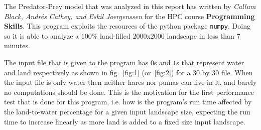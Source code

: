 \documentclass[12pt,a4paper]{article}
\begin{document}
The Predator-Prey model that was analyzed in this report has written by 
\textit{Callum Black, Andr\'es Cathey, and Eskil Joergenssen} for the HPC 
course \textbf{Programming Skills}. This program exploits the resources of the 
python package \texttt{numpy}. Doing so it is able to analyze a $100\%$ 
land-filled 
$2000$x$2000$ landscape in less than $7$ minutes. 

The input file that is given to the program has $0$s and $1$s that represent 
water and land respectively as shown in fig.~\ref{fig:1} (or~\ref{fig:2}) for a 
$30$ by $30$ 
file. When the input file is only water then neither hares nor pumas can live in 
it, and barely no computations should be done. This is the motivation for the 
first performance test that is done for this program, i.e. how is the 
program's run time affected by the land-to-water percentage for a given input 
landscape size, expecting the run time to increase linearly as more land is 
added to a fixed size input landscape.
\end{document}
